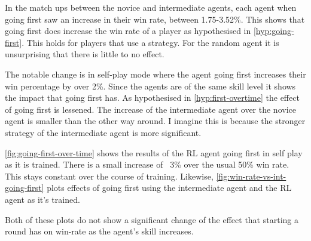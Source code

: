 \documentclass[../main.tex]{subfiles}
\begin{document}
In the match ups between the novice and intermediate agents, each agent when going first saw an increase in their win rate, between 1.75-3.52\%. This shows that going first does increase the win rate of a player as hypothesised in \cref{hyp:going-first}. This holds for players that use a strategy. For the random agent it is unsurprising that there is little to no effect. 

The notable change is in self-play mode where the agent going first increases their win percentage by over 2\%. Since the agents are of the same skill level it shows the impact that going first has. As hypothesised in \cref{hyp:first-overtime} the effect of going first is lessened. The increase of the intermediate agent over the novice agent is smaller than the other way around. I imagine this is because the stronger strategy of the intermediate agent is more significant. 

\cref{fig:going-first-over-time} shows the results of the RL agent going first in self play as it is trained. There is a small increase of ~3\% over the usual 50\% win rate. This stays constant over the course of training. Likewise, \cref{fig:win-rate-vs-int-going-first} plots effects of going first using the intermediate agent and the RL agent as it's trained. 

Both of these plots do not show a significant change of the effect that starting a round has on win-rate as the agent's skill increases. 
\end{document}
